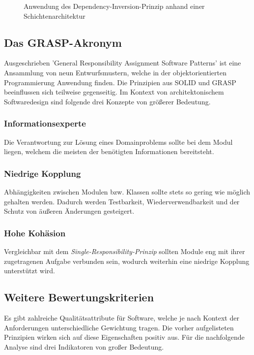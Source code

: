 \documentclass[conference]{IEEEtran}
\begin{document}
\begin{figure}[htbp]
	\small
	
	\caption{Anwendung des Dependency-Inversion-Prinzip anhand einer Schichtenarchitektur}
	\label{fig:NachDIP}
\end{figure}



\subsection{Das GRASP-Akronym} Ausgeschrieben 'General Responsibility Assignment Software Patterns' ist eine Ansammlung von neun Entwurfsmustern, welche in der objektorientierten Programmierung Anwendung finden. \cite{Larman.2009} Die Prinzipien aus SOLID und GRASP beeinflussen sich teilweise gegenseitig. Im Kontext von architektonischem Softwaredesign sind folgende drei Konzepte von größerer Bedeutung. 

\subsubsection{Informationsexperte} Die Verantwortung zur Lösung eines Domainproblems sollte bei dem Modul liegen, welchem die meisten der benötigten Informationen bereitsteht.

\subsubsection{Niedrige Kopplung} Abhängigkeiten zwischen Modulen bzw. Klassen sollte stets so gering wie möglich gehalten werden. Dadurch werden Testbarkeit, Wiederverwendbarkeit und der Schutz von äußeren Änderungen gesteigert.

\subsubsection{Hohe Kohäsion} Vergleichbar mit dem \emph{Single-Responsibility-Prinzip} sollten Module eng mit ihrer zugetragenen Aufgabe verbunden sein, wodurch weiterhin eine niedrige Kopplung unterstützt wird.



\subsection{Weitere Bewertungskriterien} Es gibt zahlreiche Qualitätsattribute für Software, welche je nach Kontext der Anforderungen unterschiedliche Gewichtung tragen. Die vorher aufgelisteten Prinzipien wirken sich auf diese Eigenschaften positiv aus. Für die nachfolgende Analyse sind drei Indikatoren von großer Bedeutung. 
\end{document}
